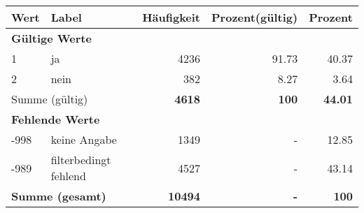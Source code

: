      \begin{longtable}{lXrrr}
     \toprule
     \textbf{Wert} & \textbf{Label} & \textbf{Häufigkeit} & \textbf{Prozent(gültig)} & \textbf{Prozent} \\
     \endhead
     \midrule
     \multicolumn{5}{l}{\textbf{Gültige Werte}}\\

     1 &
     \multicolumn{1}{X}{ ja   } &


       \num{4236} &
       \num[round-mode=places,round-precision=2]{91,73} &
         \num[round-mode=places,round-precision=2]{40,37} \\

     2 &
     \multicolumn{1}{X}{ nein   } &


       \num{382} &
       \num[round-mode=places,round-precision=2]{8,27} &
         \num[round-mode=places,round-precision=2]{3,64} \\
     \midrule
     \multicolumn{2}{l}{Summe (gültig)} &
       \textbf{\num{4618}} &
     \textbf{100} &
       \textbf{\num[round-mode=places,round-precision=2]{44,01}} \\
     \multicolumn{5}{l}{\textbf{Fehlende Werte}}\\
       -998 &
       keine Angabe &
         \num{1349} &
        - &
         \num[round-mode=places,round-precision=2]{12,85} \\
       -989 &
       filterbedingt fehlend &
         \num{4527} &
        - &
         \num[round-mode=places,round-precision=2]{43,14} \\
     \midrule
     \multicolumn{2}{l}{\textbf{Summe (gesamt)}} &
          \textbf{\num{10494}} &
        \textbf{-} &
        \textbf{100} \\
     \bottomrule
     \end{longtable}
     
